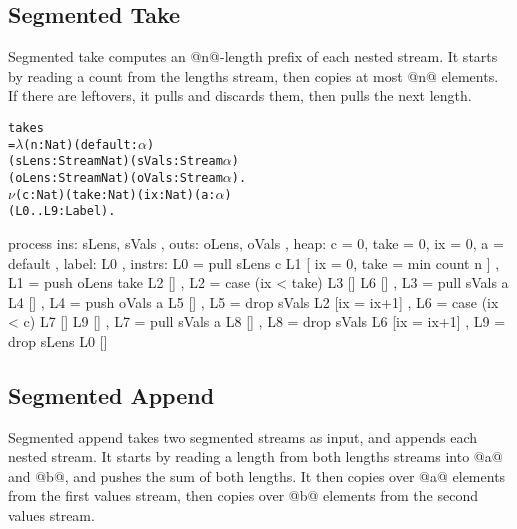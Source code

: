 \subsection{Segmented Take}
Segmented take computes an @n@-length prefix of each nested stream.
It starts by reading a count from the lengths stream, then copies at most @n@ elements.
If there are leftovers, it pulls and discards them, then pulls the next length.

\begin{alltt}
takes 
 =  \(\lambda\) (n : Nat) (default : \(\alpha\))
      (sLens: Stream Nat) (sVals: Stream \(\alpha\))
      (oLens: Stream Nat) (oVals: Stream \(\alpha\)).
    \(\nu\) (c : Nat) (take : Nat) (ix : Nat) (a: \(\alpha\))
      (L0..L9: Label).
\end{alltt}
\begin{code}
    process
    { ins:    { sLens, sVals }
    , outs:   { oLens, oVals }
    , heap:   { c = 0, take = 0, ix = 0, a = default }
    , label:  L0
    , instrs: { L0 = pull sLens c     L1 
                          [ ix = 0, take = min count n ]
              , L1 = push oLens take  L2 []
              , L2 = case (ix < take) L3 []  L6 []
              , L3 = pull sVals a     L4 []
              , L4 = push oVals a     L5 []
              , L5 = drop sVals       L2 [ix = ix+1]
              , L6 = case (ix < c)    L7 []  L9 []
              , L7 = pull sVals a     L8 []
              , L8 = drop sVals       L6 [ix = ix+1]
              , L9 = drop sLens       L0 [] } }
\end{code}


\subsection{Segmented Append}
Segmented append takes two segmented streams as input, and appends each nested stream.
It starts by reading a length from both lengths streams into @a@ and @b@, and pushes the sum of both lengths.
It then copies over @a@ elements from the first values stream, then copies over @b@ elements from the second values stream.

